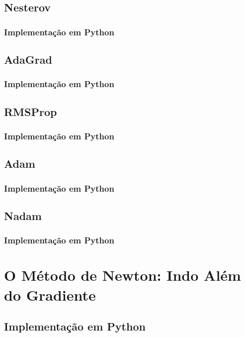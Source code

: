 \subsection{Nesterov}

\subsubsection{Implementação em Python}

\subsection{AdaGrad}

\subsubsection{Implementação em Python}

\subsection{RMSProp}

\subsubsection{Implementação em Python}

\subsection{Adam}

\subsubsection{Implementação em Python}

\subsection{Nadam}

\subsubsection{Implementação em Python}


\section{O Método de Newton: Indo Além do Gradiente}

\subsection{Implementação em Python}

